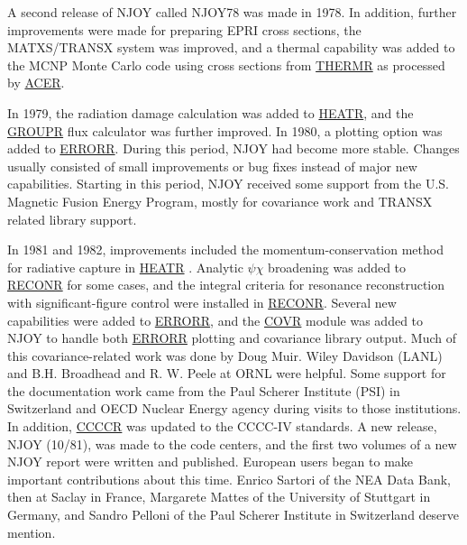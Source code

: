 A second release of NJOY called NJOY78 was made
in 1978\cite{NJ78}.  In addition, further improvements were made
for preparing EPRI cross sections, the MATXS/TRANSX
system was improved, and a thermal capability was added to the
MCNP Monte Carlo code using
cross sections from \hyperlink{sTHERMRhy}{THERMR}
as processed by \hyperlink{sACERhy}{ACER}.

In 1979, the radiation damage calculation
was added to \hyperlink{sHEATRhy}{HEATR}, and
the \hyperlink{sGROUPRhy}{GROUPR}
flux calculator was further improved.
In 1980, a plotting option was added
to \hyperlink{sERRORRhy}{ERRORR}.  During this period,
NJOY had become more stable.  Changes usually consisted of small
improvements or bug fixes instead of major new capabilities.
Starting in this period, NJOY received some support from the U.S.
Magnetic Fusion Energy Program,
mostly for covariance work and TRANSX related library support.

In 1981 and 1982, improvements included the momentum-conservation
method for radiative capture in \hyperlink{sHEATRhy}{HEATR}
. Analytic $\psi\chi$ broadening was added to \hyperlink{sRECONRhy}{RECONR}
for some cases, and the integral criteria for resonance reconstruction
with significant-figure control were installed in
\hyperlink{sRECONRhy}{RECONR}.  Several new capabilities
were added to \hyperlink{sERRORRhy}{ERRORR}, and the
\hyperlink{sCOVRhy}{COVR} module was added to NJOY to handle
both \hyperlink{sERRORRhy}{ERRORR} plotting and covariance library
output. Much of this
covariance-related work was done by Doug Muir. Wiley
Davidson (LANL) and B.H. Broadhead and R. W. Peele at ORNL were
helpful.  Some support for the documentation work came from
the Paul Scherer Institute (PSI) in Switzerland and OECD Nuclear
Energy agency during visits to those institutions.  In addition,
\hyperlink{sCCCCRhy}{CCCCR} was updated to the
CCCC-IV standards.  A new release,
NJOY (10/81), was made to the
code centers, and the first two volumes of a new
NJOY report were written and published.  European users began
to make important contributions about this time.  Enrico
Sartori of the NEA Data Bank,
then at Saclay in France, Margarete Mattes
of the University of Stuttgart in Germany, and Sandro
Pelloni of the Paul Scherer Institute
 in Switzerland deserve mention.

